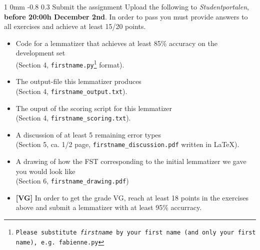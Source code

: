 \documentclass[11pt]{article}
\makeatletter
\newcommand{\newsec}[2]{\section{#1}\label{sec:#2}\noindent}
\renewcommand{\section}{\@startsection
{section}%
{1}%
{0mm}%
{-0.8\baselineskip}%
{0.3\baselineskip}%
{\bfseries\large}}%
\makeatother
\begin{document}
\newsec{Submit the assignment}{submit}%
Upload the following to {\it Studentportalen}, \textbf{before 20:00h
  December 2nd}. In order to pass you must provide answers to all
exercises and achieve at least 15/20 points.
\begin{itemize}[noitemsep,topsep=0.2cm]
\item Code for a lemmatizer that achieves at least 85\% accuracy on
  the development set\\ (Section 4, \texttt{firstname.py\footnote{Please
      substitute \emph{firstname} by your first name (and only your
      first name), e.g. \texttt{fabienne.py}}} format).
\item The output-file this lemmatizer produces\\(Section 4,
  \texttt{firstname\_output.txt}).
\item The ouput of the scoring script for this lemmatizer\\ (Section 4,
  \texttt{firstname\_scoring.txt}).
\item A discussion of at least 5 remaining error types\\ (Section 5,
  ca. 1/2 page, \texttt{firstname\_discussion.pdf} written in
  \LaTeX).
\item A drawing of how the FST corresponding to the initial lemmatizer
  we gave you would look like\\ (Section 6,
  \texttt{firstname\_drawing.pdf})
\item \textbf{[VG]} In order to get the grade VG, reach at least 18
  points in the exercises above and submit a lemmatizer with at least
  95\% accurracy. 
\end{itemize}
\end{document}
